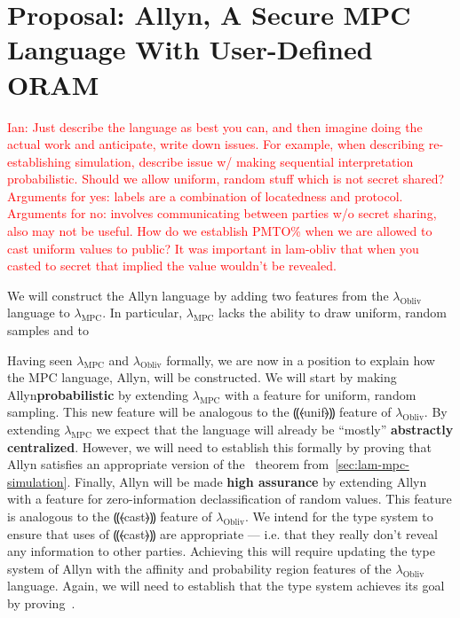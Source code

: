 \documentclass{report}
\newcommand{\lang}{Allyn\xspace}
\newcommand{\mpc}{\ensuremath{\lambda_{\mathrm{MPC}}}\xspace}
\newcommand{\obliv}{\ensuremath{\lambda_{\mathrm{Obliv}}}\xspace}
\newcommand{\ins}[1]{\textcolor{red}{Ian: #1}}
\begin{document}
\chapter{Proposal: \lang, A Secure MPC Language With User-Defined ORAM}
\label{ch:proposal}

\ins{Just describe the language as best you can, and then imagine doing the actual work and anticipate, write down issues.
  For example, when describing re-establishing simulation, describe issue w/ making sequential interpretation probabilistic.
  Should we allow uniform, random stuff which is not secret shared? Arguments for yes: labels are a combination of locatedness
  and protocol. Arguments for no: involves communicating between parties w/o secret sharing, also may not be useful.
  How do we establish PMTO\% when we are allowed to cast uniform values to public? It was important in lam-obliv that when you
  casted to secret that implied the value wouldn't be revealed.}

We will construct the \lang language by adding two features from the \obliv language to \mpc. In particular, \mpc lacks
the ability to draw uniform, random samples and to

Having seen \mpc and \obliv formally, we are now in a position to explain how the MPC language, \lang, will be constructed.
We will start by making \lang \textbf{probabilistic} by extending \mpc with a feature for uniform, random sampling. This new
feature will be analogous to the ⸨⦑unif⦒⸩ feature of \obliv. By extending \mpc we expect that the language will already be ``mostly''
\textbf{abstractly centralized}. However, we will need to establish this formally by proving that \lang satisfies an appropriate
version of the~ theorem from~\cref{sec:lam-mpc-simulation}. Finally, \lang will be made
\textbf{high assurance} by extending \lang with a feature for zero-information declassification of random values. This feature
is analogous to the ⸨⦑cast⦒⸩ feature of \obliv. We intend for the type system to ensure that uses of ⸨⦑cast⦒⸩ are appropriate
--- i.e. that they really don't reveal any information to other parties. Achieving this will require updating the type system
of \lang with the affinity and probability region features of the \obliv language. Again, we will need to establish that the
type system achieves its goal by proving~.
\end{document}
